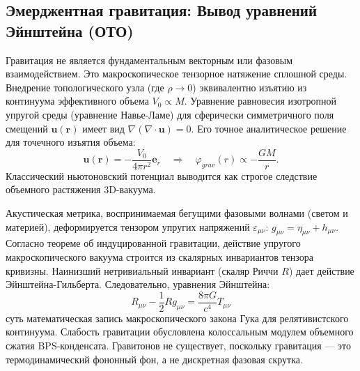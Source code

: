 \documentclass[12pt,a4paper]{article}
\begin{document}
\subsection{Эмерджентная гравитация: Вывод уравнений Эйнштейна (ОТО)}
Гравитация не является фундаментальным векторным или фазовым взаимодействием. Это макроскопическое тензорное натяжение сплошной среды. Внедрение топологического узла (где $\rho \to 0$) эквивалентно изъятию из континуума эффективного объема $V_0 \propto M$. 
Уравнение равновесия изотропной упругой среды (уравнение Навье-Ламе) для сферически симметричного поля смещений $\mathbf{u}(\mathbf{r})$ имеет вид $\nabla(\nabla \cdot \mathbf{u}) = 0$. Его точное аналитическое решение для точечного изъятия объема:
\begin{equation}
\mathbf{u}(\mathbf{r}) = -\frac{V_0}{4\pi r^2}\mathbf{e}_r \quad \Longrightarrow \quad \varphi_{grav}(r) \propto -\frac{GM}{r}.
\end{equation}
Классический ньютоновский потенциал выводится как строгое следствие объемного растяжения 3D-вакуума.

Акустическая метрика, воспринимаемая бегущими фазовыми волнами (светом и материей), деформируется тензором упругих напряжений $\varepsilon_{\mu\nu}$: $g_{\mu\nu} = \eta_{\mu\nu} + h_{\mu\nu}$. Согласно теореме об индуцированной гравитации, действие упругого макроскопического вакуума строится из скалярных инвариантов тензора кривизны. Наинизший нетривиальный инвариант (скаляр Риччи $R$) дает действие Эйнштейна-Гильберта. Следовательно, уравнения Эйнштейна:
\begin{equation}
R_{\mu\nu} - \frac{1}{2}R g_{\mu\nu} = \frac{8\pi G}{c^4} T_{\mu\nu}
\end{equation}
суть математическая запись макроскопического закона Гука для релятивистского континуума. Слабость гравитации обусловлена колоссальным модулем объемного сжатия BPS-конденсата. Гравитонов не существует, поскольку гравитация — это термодинамический фононный фон, а не дискретная фазовая скрутка.
\end{document}
